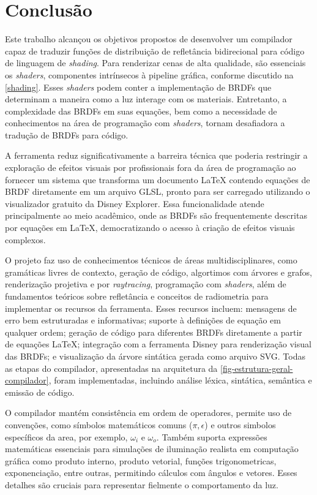 
\chapter{Conclusão} \label{chapter-conclusion}

Este trabalho alcançou os objetivos propostos de desenvolver um compilador capaz de traduzir funções de distribuição de refletância bidirecional para código de linguagem de \textit{shading}. Para renderizar cenas de alta qualidade, são essenciais os \textit{shaders}, componentes intrínsecos à pipeline gráfica, conforme discutido na \autoref{shading}. Esses \textit{shaders} podem conter a implementação de BRDFs que determinam a maneira como a luz interage com os materiais. Entretanto, a complexidade das BRDFs em suas equações, bem como a necessidade de conhecimentos na área de programação com \textit{shaders}, tornam desafiadora a tradução de BRDFs para código.

A ferramenta reduz significativamente a barreira técnica que poderia restringir a exploração de efeitos visuais por profissionais fora da área de programação ao fornecer um sistema que transforma um documento \LaTeX{} contendo equações de BRDF diretamente em um arquivo GLSL, pronto para ser carregado utilizando o visualizador gratuito da Disney Explorer. Essa funcionalidade atende principalmente ao meio acadêmico, onde as BRDFs são frequentemente descritas por equações em \LaTeX{}, democratizando o acesso à criação de efeitos visuais complexos.

O projeto faz uso de conhecimentos técnicos de áreas multidisciplinares, como gramáticas livres de contexto, geração de código, algortimos com árvores e grafos, renderização projetiva e por \textit{raytracing}, programação com \textit{shaders}, além de fundamentos teóricos sobre refletância e conceitos de radiometria para implementar os recursos da ferramenta. Esses recursos incluem: mensagens de erro bem estruturadas e informativas; suporte à definições de equação em qualquer ordem; geração de código para diferentes BRDFs diretamente a partir de equações \LaTeX{}; integração com a ferramenta Disney para renderização visual das BRDFs; e visualização da árvore sintática gerada como arquivo SVG. Todas as etapas do compilador, apresentadas na arquitetura da \autoref{fig-estrutura-geral-compilador}, foram implementadas, incluindo análise léxica, sintática, semântica e emissão de código.

O compilador mantém consistência em ordem de operadores, permite uso de convenções, como símbolos matemáticos comuns ($\pi, \epsilon$) e outros simbolos específicos da area, por exemplo, $\omega_i$ e $\omega_o$. Também suporta expressões matemáticas essenciais para simulações de iluminação realista em computação gráfica como produto interno, produto vetorial, funções trigonometricas, exponenciação, entre outras, permitindo cálculos com ângulos e vetores. Esses detalhes são cruciais para representar fielmente o comportamento da luz.

